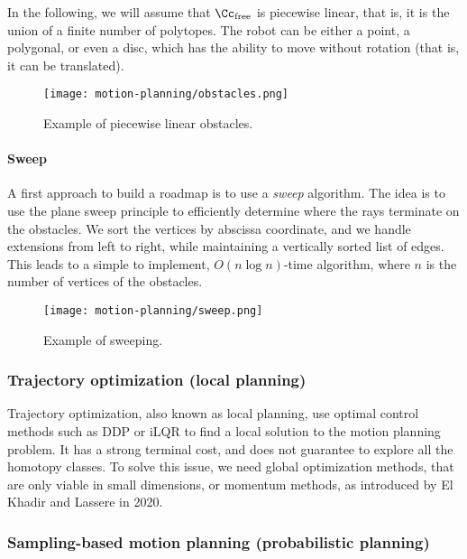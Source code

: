 In the following, we will assume that $\Cc_{\text{free}}$ is piecewise linear, that is, it is the union of a finite number of polytopes. The robot can be either a point, a polygonal, or even a disc, which has the ability to move without rotation (that is, it can be translated).
\begin{figure}[H]
    \centering
    \texttt{[image: motion-planning/obstacles.png]}
    \caption{Example of piecewise linear obstacles.}
\end{figure}

\paragraph*{Sweep}
A first approach to build a roadmap is to use a \emph{sweep} algorithm. The idea is to use the plane sweep principle to efficiently determine where the rays terminate on the obstacles. We sort the vertices by abscissa coordinate, and we handle extensions from left to right, while maintaining a vertically sorted list of edges. This leads to a simple to implement, $O(n\log n)$-time algorithm, where $n$ is the number of vertices of the obstacles.
\begin{figure}[H]
    \centering
    \texttt{[image: motion-planning/sweep.png]}
    \caption{Example of sweeping.}
\end{figure}

\subsubsection{Trajectory optimization (local planning)}
Trajectory optimization, also known as local planning, use optimal control methods such as DDP or iLQR to find a local solution to the motion planning problem. It has a strong terminal cost, and does not guarantee to explore all the homotopy classes. To solve this issue, we need global optimization methods, that are only viable in small dimensions, or momentum methods, as introduced by El Khadir and Lassere in 2020.

\subsubsection{Sampling-based motion planning (probabilistic planning)}


\newpage